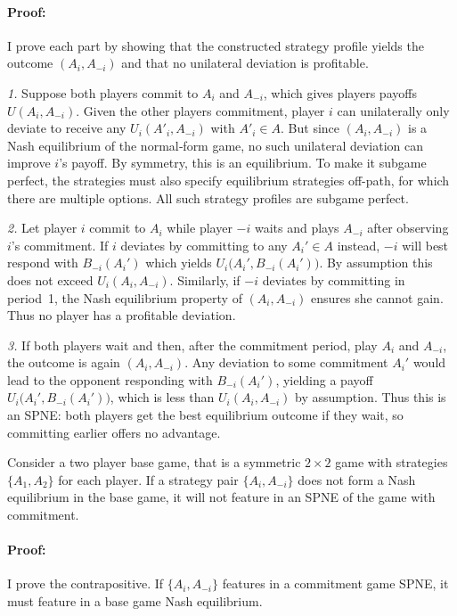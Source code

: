 \documentclass[main.tex]{subfiles}
\begin{document}
\paragraph{Proof:} I prove each part by showing that the constructed strategy profile yields the outcome $(A_i,A_{-i})$ and that no unilateral deviation is profitable.
 
\textit{1.} Suppose both players commit to $A_i$ and $A_{-i}$, which gives players payoffs $U(A_i,A_{-i})$. Given the other players commitment, player $i$ can unilaterally only deviate to receive any $U_i(A'_i,A_{-i})$ with $A'_i\in A$. But since $(A_i,A_{-i})$ is a Nash equilibrium of the normal‐form game, no such unilateral deviation can improve $i$'s payoff. By symmetry, this is an equilibrium. To make it subgame perfect, the strategies must also specify equilibrium strategies off-path, for which there are multiple options. All such strategy profiles are subgame perfect.
 
\textit{2.} Let player $i$ commit to $A_i$ while player $-i$ waits and plays $A_{-i}$ after observing $i$’s commitment. If $i$ deviates by committing to any $A_i'\in A$ instead, $-i$ will best respond with $B_{-i}(A_i')$ which yields $U_i\bigl(A_i',B_{-i}(A_i')\bigr)$. By assumption this does not exceed $U_i(A_i,A_{-i})$. Similarly, if $-i$ deviates by committing in period~1, the Nash equilibrium property of $(A_i,A_{-i})$ ensures she cannot gain. Thus no player has a profitable deviation.
 
\textit{3.} If both players wait and then, after the commitment period, play $A_i$ and $A_{-i}$, the outcome is again $(A_i,A_{-i})$. Any deviation to some commitment $A_i'$ would lead to the opponent responding with $B_{-i}(A_i')$, yielding a payoff $U_i\bigl(A_i',B_{-i}(A_i')\bigr)$, which is less than $ U_i(A_i,A_{-i})$ by assumption. Thus this is an SPNE: both players get the best equilibrium outcome if they wait, so committing earlier offers no advantage.
\begin{lemma}\label{lem:SPNE_characterization_2}
    Consider a two player base game, that is a symmetric $2\times2$ game with strategies $\{A_1,A_2\}$ for each player. If a strategy pair $\{A_i,A_{-i}\}$ does not form a Nash equilibrium in the base game, it will not feature in an SPNE of the game with commitment.
\end{lemma}
\paragraph{Proof:}
I prove the contrapositive. If $\{A_i,A_{-i}\}$ features in a commitment game SPNE, it must feature in a base game Nash equilibrium.
 
\end{document}

